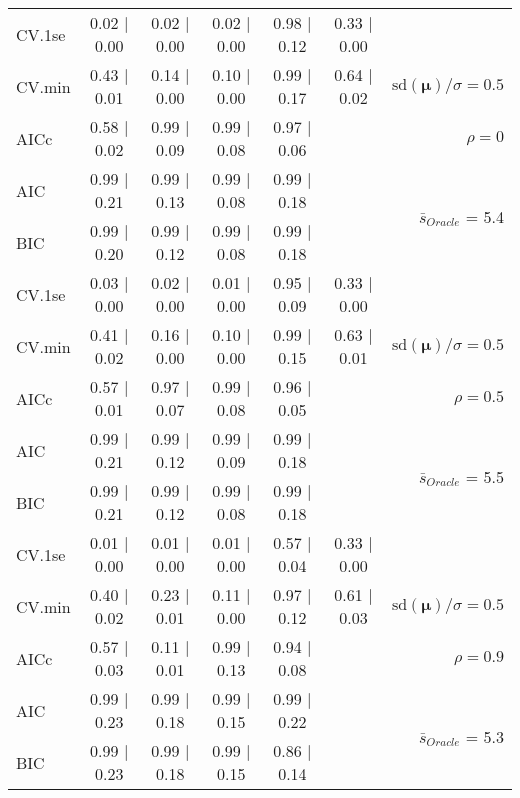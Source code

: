 \begin{table}
\begin{center}
\begin{tabular}{l*{5}{c}|r}
 \hline 
CV.1se & 0.02 $\mid$ 0.00 & 0.02 $\mid$ 0.00 & 0.02 $\mid$ 0.00 & 0.98 $\mid$ 0.12 & 0.33 $\mid$ 0.00 & \\
CV.min & 0.43 $\mid$ 0.01 & 0.14 $\mid$ 0.00 & 0.10 $\mid$ 0.00 & 0.99 $\mid$ 0.17 & 0.64 $\mid$ 0.02 &  $\mathrm{sd}(\mathbf{\mu})/\sigma=0.5$ \\
AICc & 0.58 $\mid$ 0.02 & 0.99 $\mid$ 0.09 & 0.99 $\mid$ 0.08 & 0.97 $\mid$ 0.06 & & $\rho=0$ \\
AIC & 0.99 $\mid$ 0.21 & 0.99 $\mid$ 0.13 & 0.99 $\mid$ 0.08 & 0.99 $\mid$ 0.18 & &  \multirow{2}{*}{$\bar{s}_{Oracle}$ = 5.4} \\
BIC & 0.99 $\mid$ 0.20 & 0.99 $\mid$ 0.12 & 0.99 $\mid$ 0.08 & 0.99 $\mid$ 0.18 & &  \\
 \hline 
CV.1se & 0.03 $\mid$ 0.00 & 0.02 $\mid$ 0.00 & 0.01 $\mid$ 0.00 & 0.95 $\mid$ 0.09 & 0.33 $\mid$ 0.00 & \\
CV.min & 0.41 $\mid$ 0.02 & 0.16 $\mid$ 0.00 & 0.10 $\mid$ 0.00 & 0.99 $\mid$ 0.15 & 0.63 $\mid$ 0.01 &  $\mathrm{sd}(\mathbf{\mu})/\sigma=0.5$ \\
AICc & 0.57 $\mid$ 0.01 & 0.97 $\mid$ 0.07 & 0.99 $\mid$ 0.08 & 0.96 $\mid$ 0.05 & & $\rho=0.5$ \\
AIC & 0.99 $\mid$ 0.21 & 0.99 $\mid$ 0.12 & 0.99 $\mid$ 0.09 & 0.99 $\mid$ 0.18 & &  \multirow{2}{*}{$\bar{s}_{Oracle}$ = 5.5} \\
BIC & 0.99 $\mid$ 0.21 & 0.99 $\mid$ 0.12 & 0.99 $\mid$ 0.08 & 0.99 $\mid$ 0.18 & &  \\
 \hline 
CV.1se & 0.01 $\mid$ 0.00 & 0.01 $\mid$ 0.00 & 0.01 $\mid$ 0.00 & 0.57 $\mid$ 0.04 & 0.33 $\mid$ 0.00 & \\
CV.min & 0.40 $\mid$ 0.02 & 0.23 $\mid$ 0.01 & 0.11 $\mid$ 0.00 & 0.97 $\mid$ 0.12 & 0.61 $\mid$ 0.03 &  $\mathrm{sd}(\mathbf{\mu})/\sigma=0.5$ \\
AICc & 0.57 $\mid$ 0.03 & 0.11 $\mid$ 0.01 & 0.99 $\mid$ 0.13 & 0.94 $\mid$ 0.08 & & $\rho=0.9$ \\
AIC & 0.99 $\mid$ 0.23 & 0.99 $\mid$ 0.18 & 0.99 $\mid$ 0.15 & 0.99 $\mid$ 0.22 & &  \multirow{2}{*}{$\bar{s}_{Oracle}$ = 5.3} \\
BIC & 0.99 $\mid$ 0.23 & 0.99 $\mid$ 0.18 & 0.99 $\mid$ 0.15 & 0.86 $\mid$ 0.14 & &  \\
 \hline 
\end{tabular}
\end{center}
\vspace{-1cm}
\end{table}




